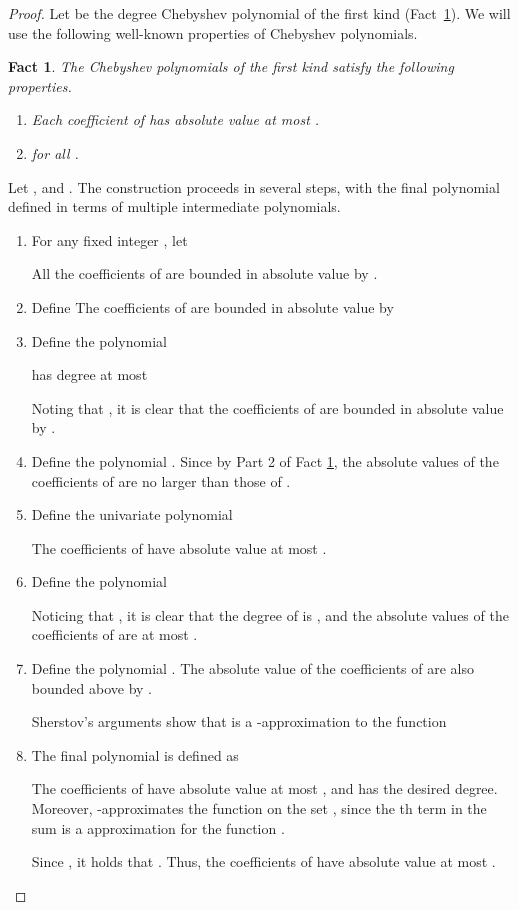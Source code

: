 \documentclass[11pt]{article}
\newtheorem{fact}[theorem]{Fact}
\theoremstyle{definition}
\begin{document}
\begin{proof}
Let  be the degree  Chebyshev polynomial of the first kind (Fact~\ref{fact:coeff}). We will use the following well-known properties of Chebyshev polynomials.

\begin{fact} \label{fact:coeff} The Chebyshev polynomials of the first kind satisfy the following properties.

\begin{enumerate}
\item Each coefficient of  has absolute value at most .
\item  for all . 
\end{enumerate}
\end{fact} 

Let , and . 
The construction proceeds in several steps, with the final polynomial  defined in terms of multiple intermediate polynomials. 

\begin{enumerate}
\item For any fixed integer ,  let 
 
All the coefficients of  are bounded in absolute value by .  

\item Define  The coefficients of  are bounded in absolute value by 


\item Define the polynomial 

 has degree at most 

Noting that , it is clear that the coefficients of  are bounded in absolute value by .

\item Define the polynomial . Since  by Part 2 of Fact \ref{fact:coeff}, the absolute values of the coefficients of  are no larger than those of .

\item Define the univariate polynomial  

The coefficients of  have absolute value at most .

\item Define the polynomial 



Noticing that , it is clear that the degree of  is , and the absolute values of the coefficients of  are at most
. 

\item Define the polynomial . The absolute value of the coefficients of  are also 
bounded above by . 

Sherstov's arguments show that  is a -approximation to the function 

\item The final polynomial  is defined as 

The coefficients of  have absolute value at most , and  has the desired degree.
Moreover,  -approximates the function  on the set , since the th term in the sum 
 is a   approximation for the function
.

Since , it holds that . Thus, the coefficients of  have absolute value at most .


\end{enumerate}


\end{proof}
\else
\fi
\end{document}
